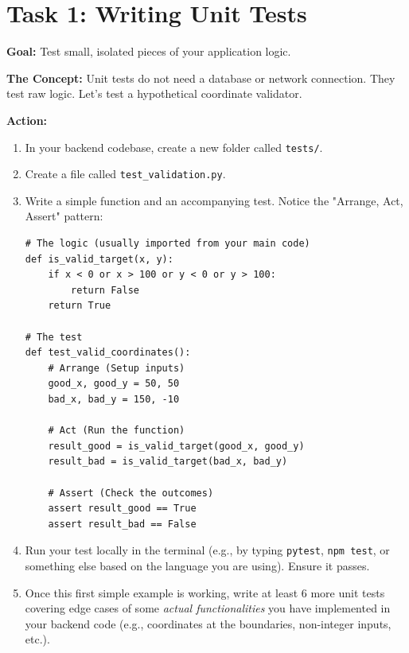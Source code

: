 \documentclass[a4paper,12pt]{article}
\begin{document}
\section*{Task 1: Writing Unit Tests}

\textbf{Goal:} Test small, isolated pieces of your application logic.

\textbf{The Concept:} Unit tests do not need a database or network connection. They test raw logic. Let's test a hypothetical coordinate validator.

\vspace{0.3cm}
\textbf{Action:}
\begin{enumerate}
    \item In your backend codebase, create a new folder called \texttt{tests/}.
    \item Create a file called \texttt{test\_validation.py}.
    \item Write a simple function and an accompanying test. Notice the "Arrange, Act, Assert" pattern:
    \begin{verbatim}
# The logic (usually imported from your main code)
def is_valid_target(x, y):
    if x < 0 or x > 100 or y < 0 or y > 100:
        return False
    return True

# The test
def test_valid_coordinates():
    # Arrange (Setup inputs)
    good_x, good_y = 50, 50
    bad_x, bad_y = 150, -10
    
    # Act (Run the function)
    result_good = is_valid_target(good_x, good_y)
    result_bad = is_valid_target(bad_x, bad_y)
    
    # Assert (Check the outcomes)
    assert result_good == True
    assert result_bad == False
    \end{verbatim}
    \item Run your test locally in the terminal (e.g., by typing \texttt{pytest}, \texttt{npm test}, or something else based on the language you are using). Ensure it passes.
    \item Once this first simple example is working, write at least 6 more unit tests covering edge cases of some \textit{actual functionalities} you have implemented in your backend code (e.g., coordinates at the boundaries, non-integer inputs, etc.).
\end{enumerate}

\end{document}
